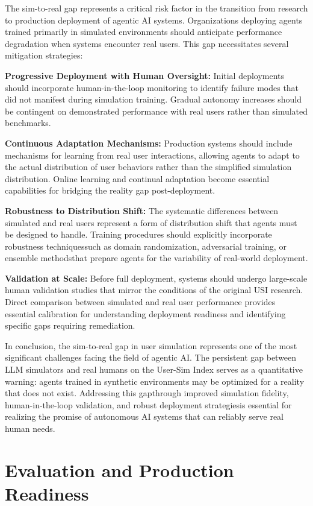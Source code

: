The sim-to-real gap represents a critical risk factor in the transition from research to production deployment of agentic AI systems. Organizations deploying agents trained primarily in simulated environments should anticipate performance degradation when systems encounter real users. This gap necessitates several mitigation strategies:

\textbf{Progressive Deployment with Human Oversight:} Initial deployments should incorporate human-in-the-loop monitoring to identify failure modes that did not manifest during simulation training. Gradual autonomy increases should be contingent on demonstrated performance with real users rather than simulated benchmarks.

\textbf{Continuous Adaptation Mechanisms:} Production systems should include mechanisms for learning from real user interactions, allowing agents to adapt to the actual distribution of user behaviors rather than the simplified simulation distribution. Online learning and continual adaptation become essential capabilities for bridging the reality gap post-deployment.

\textbf{Robustness to Distribution Shift:} The systematic differences between simulated and real users represent a form of distribution shift that agents must be designed to handle. Training procedures should explicitly incorporate robustness techniquessuch as domain randomization, adversarial training, or ensemble methodsthat prepare agents for the variability of real-world deployment.

\textbf{Validation at Scale:} Before full deployment, systems should undergo large-scale human validation studies that mirror the conditions of the original USI research. Direct comparison between simulated and real user performance provides essential calibration for understanding deployment readiness and identifying specific gaps requiring remediation.

In conclusion, the sim-to-real gap in user simulation represents one of the most significant challenges facing the field of agentic AI. The persistent gap between LLM simulators and real humans on the User-Sim Index serves as a quantitative warning: agents trained in synthetic environments may be optimized for a reality that does not exist. Addressing this gapthrough improved simulation fidelity, human-in-the-loop validation, and robust deployment strategiesis essential for realizing the promise of autonomous AI systems that can reliably serve real human needs.
\section{Evaluation and Production Readiness}

